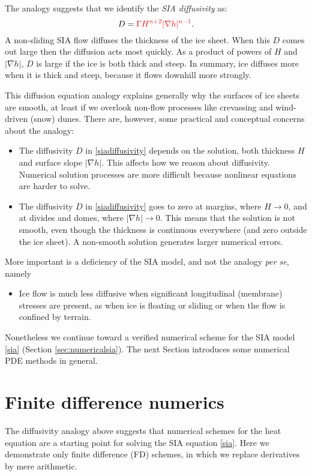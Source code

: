 \documentclass[letterpaper,final,12pt,reqno]{amsart}
\newcommand{\grad}{\nabla}
\begin{document}
The analogy suggests that we identify the \emph{SIA diffusivity} as:
\begin{equation}
	D = {\color{red}\Gamma H^{n+2} |\grad h|^{n-1}}.  \label{siadiffusivity}
\end{equation}
A non-sliding SIA flow diffuses the thickness of the ice sheet.  When this $D$ comes out large then the diffusion acts most quickly.  As a product of powers of $H$ and $|\grad h|$, $D$ is large if the ice is both thick and steep.  In summary, ice diffuses more when it is thick and steep, because it flows downhill more strongly.

This diffusion equation analogy explains generally why the surfaces of ice sheets are smooth, at least if we overlook non-flow processes like crevassing and wind-driven (snow) dunes.  There are, however, some practical and conceptual concerns about the analogy:
\begin{itemize}
\item The diffusivity $D$ in \eqref{siadiffusivity} depends on the solution, both thickness $H$ and surface slope $|\grad h|$.  This affects how we reason about diffusivity.  Numerical solution processes are more difficult because nonlinear equations are harder to solve.
\item The diffusivity $D$ in \eqref{siadiffusivity} goes to zero at margins, where $H\to 0$, and at divides and domes, where $|\grad h|\to 0$.  This means that the solution is not smooth, even though the thickness is continuous everywhere (and zero outside the ice sheet).  A non-smooth solution generates larger numerical errors.
\end{itemize}
More important is a deficiency of the SIA model, and not the analogy \emph{per se}, namely
\begin{itemize}
\item Ice flow is much less diffusive when significant longitudinal (membrane) stresses are present, as when ice is floating or sliding or when the flow is confined by terrain.
\end{itemize}
Nonetheless we continue toward a verified numerical scheme for the SIA model \eqref{sia} (Section \ref{sec:numericalsia}).  The next Section introduces some numerical PDE methods in general.


\section{Finite difference numerics}  \label{sec:fd}

The diffusivity analogy above suggests that numerical schemes for the heat equation are a starting point for solving the SIA equation \eqref{sia}.  Here we demonstrate only finite difference (FD) schemes, in which we replace derivatives by mere arithmetic.
\end{document}
